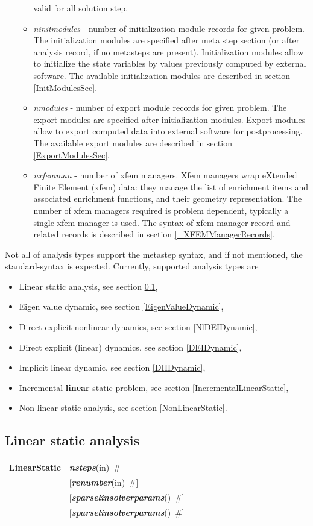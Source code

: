 \documentclass[a4paper]{article}
\makeatletter
\newcommand{\param}[1]{{\em #1}}
\newcommand{\keywordnotype}[1]{\mbox{{\it{\bf{#1}}}}}
\newcommand{\keyword}[2]{\mbox{{\keywordnotype{#1}\tiny (#2)}}}
\newcommand{\entKeywordInst}[1]{\mbox{{\bf{{#1}}}}}
\newcommand{\field}[2]{\mbox{\keyword{#1}{#2}~\#}}
\newcommand{\optField}[2]{\mbox{[\field{#1}{#2}]}}
\newenvironment{record}[1][]{\begin{tabular}{|ll}}{\end{tabular}\\}
\newcommand{\recentry}[2]{{#1}&{#2}\\}
\newcounter{rcc}
\newenvironment{record}[1][\textwidth]{\setcounter{rcc}{0}\begin{tabular*}{#1}{|ll@{\extracolsep{\fill}}r}}{\end{tabular*}\\}
\newcommand{\recentry}[2]{\ifthenelse{\value{rcc}>0}{&$\backslash$ \\}{\setcounter{rcc}{1}}{#1}&{#2}}
\makeatother
\begin{document}
\begin{itemize}
\begin{itemize}
valid for all solution step.
\item \param{ninitmodules} - number of initialization module records for given
problem. The initialization modules are specified after meta step section (or
after analysis record, if no metasteps are present). Initialization modules
allow to initialize the state variables by values previously computed by 
external software. The available initialization modules are described in section
\ref{InitModulesSec}.
\item \param{nmodules} - number of export module records for given
problem. The export modules are specified after initialization modules. Export modules
allow to export computed data into external software for
postprocessing. The available export modules are described in section
\ref{ExportModulesSec}.
\item \param{nxfemman} - number of xfem managers. Xfem managers wrap eXtended Finite Element (xfem) data: they  manage the list of enrichment items and associated enrichment functions, and their geometry representation. The number of xfem managers required is problem dependent, typically a single xfem manager is used. The syntax of xfem manager record and related records is described in section \ref{_XFEMManagerRecords}.
\end{itemize}

\end{itemize}
Not all of analysis types support the metastep syntax, and if
not mentioned, the standard-syntax is expected.
Currently, supported analysis types are

\begin{itemize}
\item Linear static analysis, see section \ref{LinearStatic},
\item Eigen value dynamic, see section \ref{EigenValueDynamic},
\item Direct explicit  nonlinear dynamics, see section
\ref{NlDEIDynamic},
\item Direct explicit (linear) dynamics, see section \ref{DEIDynamic},
\item Implicit linear dynamic, see section \ref{DIIDynamic},
\item Incremental {\bf linear} static problem, see section \ref{IncrementalLinearStatic},
\item Non-linear static analysis, see section \ref{NonLinearStatic}.
\end{itemize}

\subsection{Linear static analysis}
\label{LinearStatic}
\begin{record}
\recentry{\entKeywordInst{LinearStatic}}{\field{nsteps}{in}}
\recentry{}{\optField{renumber}{in}}
\recentry{}{\optField{sparselinsolverparams}{}}
\recentry{}{\optField{sparselinsolverparams}{}}
\end{record}
\end{document}
